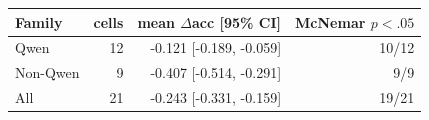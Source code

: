 \begin{tabular}{lrrr}
\toprule
Family & cells & mean $\Delta$acc [95\% CI] & McNemar $p<.05$ \\
\midrule
Qwen & 12 & -0.121 [-0.189, -0.059] & 10/12 \\
Non-Qwen & 9 & -0.407 [-0.514, -0.291] & 9/9 \\
All & 21 & -0.243 [-0.331, -0.159] & 19/21 \\
\bottomrule
\end{tabular}
